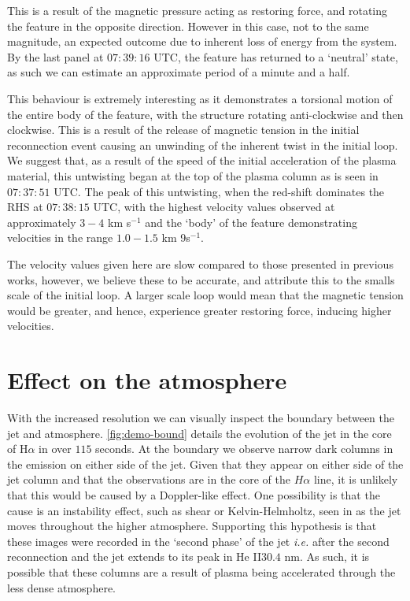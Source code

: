 This is a result of the magnetic pressure acting as restoring force, and rotating the feature in the opposite direction. 
However in this case, not to the same magnitude, an expected outcome due to inherent loss of energy from the system.
By the last panel at $07:39:16$ UTC, the feature has returned to a `neutral' state, as such we can estimate an approximate period of a minute and a half.

This behaviour is extremely interesting as it demonstrates a torsional motion of the entire body of the feature, with the structure rotating anti-clockwise and then clockwise.
This is a result of the release of magnetic tension in the initial reconnection event causing an unwinding of the inherent twist in the initial loop.
We suggest that, as a result of the speed of the initial acceleration of the plasma material, this untwisting began at the top of the plasma column as is seen in $07:37:51$ UTC.
The peak of this untwisting, when the red-shift dominates the RHS at $07:38:15$ UTC, with the highest velocity values observed at approximately $3-4$ km s${^{-1}}$ and the `body' of the feature demonstrating velocities in the range $1.0-1.5$ km 9s${^{-1}}$.

The velocity values given here are slow compared to those presented in previous works, however, we believe these to be accurate, and attribute this to the smalls scale of the initial loop.
A larger scale loop would mean that the magnetic tension would be greater, and hence, experience greater restoring force, inducing higher velocities.

  









\section{Effect on the atmosphere}
\label{sec:temp-map-sect}

With the increased resolution we can visually inspect the boundary between the jet and atmosphere.
\cref{fig:demo-bound} details the evolution of the jet in the core of H$\alpha$ in over $115$ seconds.
At the boundary we observe narrow dark columns in the emission on either side of the jet.
Given that they appear on either side of the jet column and that the observations are in the core of the $H\alpha$ line, it is unlikely that this would be caused by a Doppler-like effect.
One possibility is that the cause is an instability effect, such as shear or Kelvin-Helmholtz, seen in \cite{Zaqarashvili2014} as the jet moves throughout the higher atmosphere.
Supporting this hypothesis is that these images were recorded in the `second phase' of the jet \emph{i.e.} after the second reconnection and the jet extends to its peak in He II$30.4$ nm. 
As such, it is possible that these columns are a result of plasma being accelerated through the less dense atmosphere.

